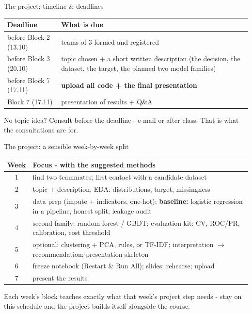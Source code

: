 \documentclass[10pt,aspectratio=169]{beamer}
\begin{document}
\begin{frame}{The project: timeline \& deadlines}
  \small
  \begin{center}
  \begin{tabular}{@{}lp{8.2cm}@{}}
    \toprule
    Deadline & What is due \\
    \midrule
    \alert{before Block 2} (13.10) & teams of 3 formed and registered \\
    \alert{before Block 3} (20.10) & topic chosen + a short written
      description (the decision, the dataset, the target, the planned two
      model families) \\
    \alert{before Block 7} (17.11) & \textbf{upload all code + the final
      presentation} \\
    Block 7 (17.11) & presentation of results + Q\&A \\
    \bottomrule
  \end{tabular}
  \end{center}
  \vspace{0.5em}
  \begin{center}
    No topic idea? \alert{Consult before the deadline} - e-mail or after
    class. That is what the consultations are for.
  \end{center}
\end{frame}

\begin{frame}{The project: a sensible week-by-week split}
  \small
  \begin{center}
  \begin{tabular}{@{}cp{11cm}@{}}
    \toprule
    Week & Focus - with the suggested methods \\
    \midrule
    1 & find two teammates; first contact with a candidate dataset \\
    2 & topic + description; EDA: distributions, target, missingness \\
    3 & data prep (impute + indicators, one-hot); \textbf{baseline:}
        logistic regression in a pipeline, honest split; leakage audit \\
    4 & second family: random forest / GBDT; evaluation kit: CV,
        ROC/PR, calibration, cost threshold \\
    5 & optional: clustering + PCA, rules, or TF-IDF; interpretation
        $\to$ recommendation; presentation skeleton \\
    6 & freeze notebook (Restart \& Run All); slides; rehearse;
        \alert{upload} \\
    7 & present the results \\
    \bottomrule
  \end{tabular}
  \end{center}
  \vspace{0.4em}
  \begin{center}\small
    Each week's block teaches exactly what that week's project step needs -
    stay on this schedule and the project builds itself alongside the course.
  \end{center}
\end{frame}
\end{document}
